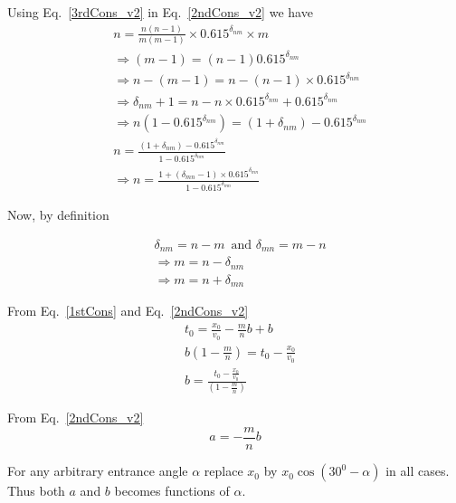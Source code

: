 \documentclass[12pt]{article}
\begin{document}
Using Eq.~\ref{3rdCons_v2} in Eq.~\ref{2ndCons_v2} we have
\begin{equation}\label{}
\begin{split}
& n = \frac{n(n-1)}{m(m-1)}\times 0.615^{\delta_{nm}} \times m \\
&\Rightarrow (m-1) = (n -1)0.615^{\delta_{nm}}\\
&\Rightarrow n - (m - 1) = n - (n - 1)\times 0.615^{\delta_{nm}} \\
&\Rightarrow \delta_{nm} + 1 = n - n \times 0.615^{\delta_{nm}} + 0.615^{\delta_{nm}} \\
& \Rightarrow n(1 - 0.615^{\delta_{nm}}) = (1 + \delta_{nm}) - 0.615^{\delta_{nm}}\\
& n = \frac{(1 + \delta_{nm}) - 0.615^{\delta_{nm}}}{1 - 0.615^{\delta_{nm}}}\\
& \boxed{\Rightarrow n = \frac{1 + (\delta_{mn} -1)\times 0.615^{\delta_{mn}}}{1 - 0.615^{\delta_{mn}}}}
\end{split}
\end{equation}
 
Now, by definition

\begin{equation}\label{}
\begin{split}
& \delta_{nm} = n - m \,\,\,\textrm{and}\,\, \delta_{mn} = m - n\\
&  \Rightarrow m = n - \delta_{nm} \\
& \boxed{\Rightarrow m  = n + \delta_{mn}}
\end{split}
\end{equation}

From Eq.~\ref{1stCons} and Eq.~\ref{2ndCons_v2}
\begin{equation}\label{}
\begin{split}
& t_0 = \frac{x_0}{v_0} - \frac{m}{n}b + b\\
& b( 1 - \frac{m}{n}) = t_0 - \frac{x_0}{v_0}\\
& \boxed{b = \frac{t_0 - \frac{x_0}{v_0}}{( 1 - \frac{m}{n})}}
\end{split}
\end{equation}

From Eq.~\ref{2ndCons_v2}
\begin{equation}\label{}
\boxed{a = -\frac{m}{n} b}
\end{equation}

For any arbitrary entrance angle $\alpha$ replace $x_0$ by $x_0\cos(30^0 -\alpha)$ in all cases. Thus both $a$ and $b$ becomes functions of $\alpha$.
\end{document}
